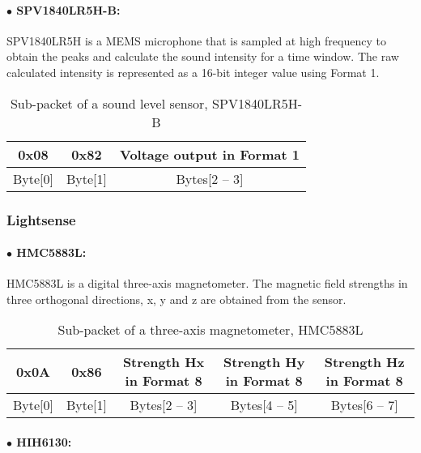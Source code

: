 \paragraph{$\bullet$ SPV1840LR5H-B:}

SPV1840LR5H is a MEMS microphone that is sampled at high frequency to obtain
the peaks and calculate the sound intensity for a time window. The raw calculated
intensity is represented as a 16-bit integer value using Format 1.
\\

\begin{table}[h!]
    \centering
    \caption{Sub-packet of a sound level sensor, SPV1840LR5H-B}
    \begin{tabular}{|c|c|c|}
        \hline
        \rowcolor{black!8}
        \textbf{0x08} & \textbf{0x82} & \textbf{Voltage output in Format 1} \\
        \hline
        Byte[0] & Byte[1] & Bytes[2 -- 3]\\ \hline
    \end{tabular}
\end{table}


\subsubsection{Lightsense}

\paragraph{$\bullet$ HMC5883L:}
HMC5883L is a digital three-axis magnetometer. The magnetic field strengths in three orthogonal directions,
x, y and z are obtained from the sensor.
\\

\begin{table}[h!]
    \centering
    \caption{Sub-packet of a three-axis magnetometer, HMC5883L}
    \begin{tabular}{|c|c|c|c|c|}
        \hline
        \rowcolor{black!8}
        \textbf{0x0A} & \textbf{0x86} & \textbf{Strength Hx in Format 8} & \textbf{Strength Hy in Format 8} & \textbf{Strength Hz in Format 8}\\
        \hline
        Byte[0] & Byte[1] & Bytes[2 -- 3] & Bytes[4 -- 5] & Bytes[6 -- 7] \\ \hline
    \end{tabular}
\end{table}



\paragraph{$\bullet$ HIH6130:}

